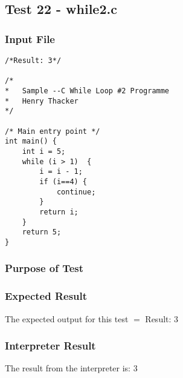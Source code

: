 \subsection{Test 22 - while2.c}
\subsubsection{Input File}
\begin{lstlisting}[showstringspaces=false,breaklines=true,backgroundcolor=\color{light-gray}, captionpos=b]
/*Result: 3*/

/*
*	Sample --C While Loop #2 Programme
*	Henry Thacker
*/

/* Main entry point */
int main() {
	int i = 5;
	while (i > 1)  {
		i = i - 1;
		if (i==4) {
			continue;
		}
		return i;
	}
	return 5;
}
\end{lstlisting}\subsubsection{Purpose of Test}

\subsubsection{Expected Result}
The expected output for this test $=$ Result: 3
\subsubsection{Interpreter Result}
The result from the interpreter is: 3
